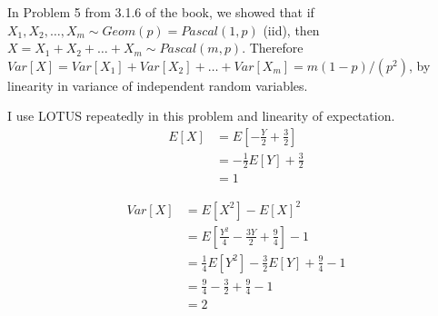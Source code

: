 \begin{problem}{18}   In Problem 5 from 3.1.6 of the book, we showed that if $X_1, X_2, \ldots, X_m \sim Geom(p)=Pascal(1, p)$ (iid), then $X=X_1+X_2+ \ldots +X_m \sim Pascal(m, p)$.  Therefore $Var[X] = Var[X_1]+Var[X_2]+\ldots+Var[X_m] = m(1-p)/(p^2)$, by linearity in variance of independent random variables. 



\end{problem}

\begin{problem}{19}  I use LOTUS repeatedly in this problem and linearity of expectation.
\begin{align*}
E[X] &= E \left[ -\frac{Y}{2}+\frac{3}{2} \right] \\
& = -\frac{1}{2}E[Y]+\frac{3}{2} \\
& = 1
\end{align*}



\begin{align*}
Var[X] &= E[X^2]-E[X]^2 \\
& = E\left[\frac{Y^2}{4}-\frac{3Y}{2}+\frac{9}{4}\right] -1\\
&=\frac{1}{4}E[Y^2]-\frac{3}{2}E[Y]+\frac{9}{4}-1 \\
&=\frac{9}{4}-\frac{3}{2}+\frac{9}{4}-1 \\
&=2
\end{align*}

\end{problem}

